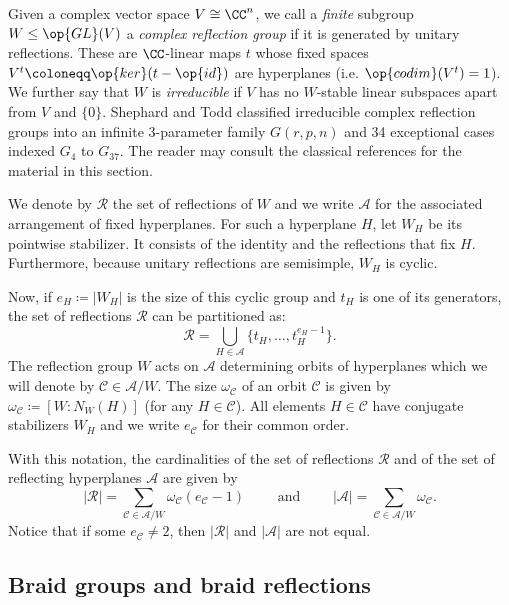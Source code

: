 Given a complex vector space $V\cong \CC^n$, we call a {\it finite} subgroup $W\leq \op{GL}(V)$ a {\it\color{blue} complex reflection group} if it is generated by unitary reflections. These are $\CC$-linear maps $t$ whose fixed spaces $V^t\coloneqq \op{ker}(t-\op{id})$ are hyperplanes (i.e. $\op{codim}(V^t)=1$). We further say that $W$ is {\it irreducible} if $V$ has no $W$-stable linear subspaces apart from $V$ and $\{0\}$. Shephard and Todd \cite{shephard-and-todd} classified irreducible complex reflection groups into an infinite $3$-parameter family $G(r,p,n)$ and 34 exceptional cases indexed $G_4$ to $G_{37}$. The reader may consult the classical references \cite{broue-book-braid-groups,kane-book-reflection-groups,lehrer-taylor-book} for the material in this section.


We denote by $\mathcal{R}$ the set of reflections of $W$ and we write $\mathcal{A}$ for the associated arrangement of fixed hyperplanes. For such a hyperplane $H$, let $W_H$ be its pointwise stabilizer. It consists of the identity and the reflections that fix $H$. Furthermore, because unitary reflections are semisimple, $W_H$ is cyclic.

    
Now, if $e_H\coloneqq |W_H|$ is the size of this cyclic group and $t_H$ is one of its generators, the set of reflections $\mathcal{R}$ can be partitioned as:\begin{equation} \mathcal{R}=\bigcup_{H\in\mathcal{A}}\{ t_H,\ldots, t_H^{e_H-1} \}.\label{EQ: Reflection set partition into cyclis}\end{equation}
The reflection group $W$ acts on $\mathcal{A}$ determining orbits of hyperplanes which we will denote by $\mathcal{C}\in\mathcal{A}/W$. The size $\omega_{\mathcal{C}}$ of an orbit $\mathcal{C}$ is given by $\omega_{\mathcal{C}}\coloneqq [W:N_W(H)]$ (for any $H\in \mathcal{C}$). All elements $H\in\mathcal{C}$ have conjugate stabilizers $W_H$ and we write $e_{\mathcal{C}}$ for their common order.

With this notation, the cardinalities of the set of reflections $\mathcal{R}$ and of the set of reflecting hyperplanes $\mathcal{A}$ are given by $$|\mathcal{R}|=\sum_{\mathcal{C}\in\mathcal{A}/W}\omega_{\mathcal{C}}(e_{\mathcal{C}}-1)\quad\quad\text{ and }\quad\quad |\mathcal{A}|=\sum_{\mathcal{C}\in\mathcal{A}/W}\omega_{\mathcal{C}}.$$
Notice that if some $e_{\mathcal{C}}\neq 2$, then $|\mathcal{R}|$ and $|\mathcal{A}|$ are not equal.
\subsection{Braid groups and braid reflections}
\label{Section: Braid groups and generators of the monodromy}

